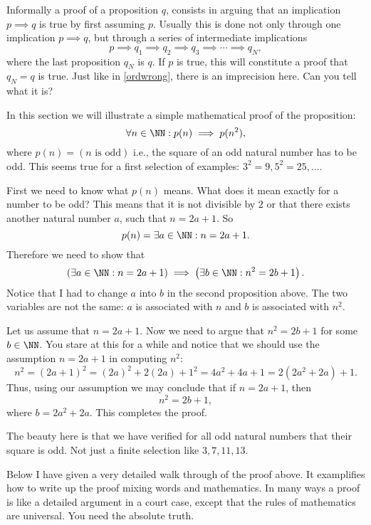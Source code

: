 \documentclass{article}
\begin{document}
Informally a proof of a proposition $q$, consists in arguing that an implication $p\implies q$ is true by first assuming $p$. Usually this is done
not only through one implication $p\implies q$, but through a series
of intermediate implications
$$
p\implies q_1 \implies q_2 \implies q_3 \implies \cdots \implies q_N,
$$
where the last proposition $q_N$ is $q$. If $p$ is true, this
will constitute a proof that $q_N = q$ is true. Just like in \eqref{ordwrong},
there is an imprecision here. Can you tell what it is?

In this section we will illustrate a simple mathematical proof of the
proposition:
$$
\forall n\in \NN: p(n)\implies p(n^2),
$$
where $p(n) = (n\text{ is odd})$ i.e., the square of an odd
natural number has to be odd. This seems true for a first selection
of examples: $3^2=9, 5^2=25, \dots$.

First we need to know what $p(n)$ means. What does it mean
exactly for a number to be odd? This means that it is
not divisible by $2$ or that there exists another
natural number $a$, such that $n = 2 a + 1$. So
$$
p(n) = \exists a\in \NN: n = 2 a + 1.
$$
Therefore we need to show that
$$
\left(\exists a\in \NN: n = 2 a + 1\right) \implies
\left(\exists b\in \NN: n^2 = 2 b + 1\right).
$$
Notice that I had to change $a$ into $b$ in the second proposition above.
The two variables are not the same: $a$ is associated with $n$ and
$b$ is associated with $n^2$.

Let us assume that $n = 2 a + 1$. Now we need to argue that $
n^2 = 2 b + 1$ for some $b\in \NN$. You stare at this for a while
and notice that we should use the assumption $n=2 a + 1$ in
computing $n^2$:
$$
n^2 = (2 a + 1)^2 = (2 a)^2 + 2 (2 a) + 1^2 = 4 a^2 + 4 a + 1 =
2(2 a^2 + 2 a) + 1.
$$
Thus, using our assumption we may conclude that if $n = 2 a + 1$, then
$$
n^2 = 2 b + 1,
$$
where $b=2a^2+ 2 a$. This completes the proof.

The beauty here is that we have verified for all odd natural numbers
that their square is odd. Not just a finite selection like
$3, 7, 11, 13$.

Below I have given a very detailed walk through of the proof above. It
examplifies how to write up the proof mixing words and mathematics. In
many ways a proof is like a detailed argument in a court case, except
that the rules of mathematics are universal. You need the absolute truth.

\begin{video}\label{Video:proofexample}
\end{video}
\end{document}
